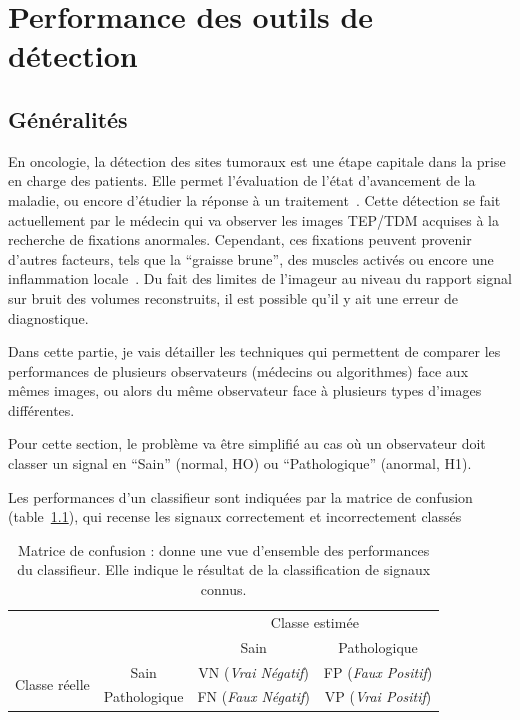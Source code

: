 \chapter{Performance des outils de détection}
\label{lab:chapCAD}
	\section{Généralités}

En oncologie, la détection des sites tumoraux est une étape capitale dans la prise en charge des patients. Elle permet l'évaluation de l'état d'avancement de la maladie, ou encore d'étudier la réponse à un traitement~\cite{dimitrakopoulou2002role}. Cette détection se fait actuellement par le médecin qui va observer les images TEP/TDM acquises à la recherche de fixations anormales. Cependant, ces fixations peuvent provenir d'autres facteurs, tels que la ``graisse brune'', des muscles activés ou encore une inflammation locale~\cite{bordessoule2006impact}. Du fait des limites de l'imageur au niveau du rapport signal sur bruit des volumes reconstruits, il est possible qu'il y ait une erreur de diagnostique.

Dans cette partie, je vais détailler les techniques qui permettent de comparer les performances de plusieurs observateurs (médecins ou algorithmes) face aux mêmes images, ou alors du même observateur face à plusieurs types d'images différentes.

Pour cette section, le problème va être simplifié au cas où un observateur doit classer un signal en ``Sain'' (normal, HO) ou ``Pathologique'' (anormal, H1). 

Les performances d'un classifieur sont indiquées par la matrice de confusion (table~\ref{tab:confusion}), qui recense les signaux correctement et incorrectement classés 

\begin{table}[h]
	\label{tab:confusion}
	\begin{tabular}{cc c|c|}
		& & \multicolumn{2}{c}{Classe estimée} \\
		\cline{3-4}	
		& & \multicolumn{1}{|c|}{Sain} & Pathologique \\ 
		\cline{2-4}
		\multicolumn{1}{c|}{\multirow{2}{*}{Classe réelle}} & \multicolumn{1}{|c|}{Sain} & VN (\emph{Vrai Négatif}) & FP (\emph{Faux Positif})\\
		\cline{2-4}
		\multicolumn{1}{c|}{} & \multicolumn{1}{|c|}{Pathologique} & FN (\emph{Faux Négatif}) & VP (\emph{Vrai Positif})\\
		\cline{2-4}
	\end{tabular}
	\caption{Matrice de confusion : donne une vue d'ensemble des performances du classifieur. Elle indique le résultat de la classification de signaux connus.}
\end{table}

